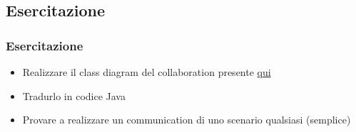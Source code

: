 \documentclass{beamer}
\begin{document}
\subsection{Esercitazione}
\begin{frame}
\frametitle{Esercitazione}	

\begin{itemize}
	\item Realizzare il class diagram del collaboration presente  \href{http://www.agilemodeling.com/artifacts/communicationDiagram.htm}{qui}
	\item Tradurlo in codice Java 
	\item Provare a realizzare un communication di uno scenario qualsiasi (semplice)
\end{itemize}
\end{frame}
\end{document}
